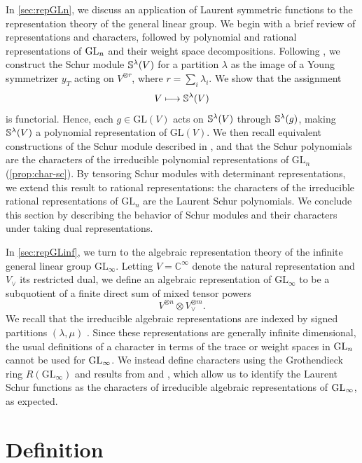 \documentclass[11pt]{amsart}
\begin{document}
In \cref{sec:repGLn}, we discuss an application of Laurent symmetric functions to the representation theory of the general linear group. We begin with a brief review of representations and characters, followed by polynomial and rational representations of $\mathrm{GL}_n$ and their weight space decompositions. Following \cite{Ful97}, we construct the Schur module $\mathbb{S}^\lambda(V)$ for a partition $\lambda$ as the image of a Young symmetrizer $y_T$ acting on $V^{\otimes r}$, where $r=\sum_i \lambda_i$. We show that the assignment
\[V \longmapsto \mathbb{S}^\lambda(V)\]
is functorial. Hence, each $g \in \mathrm{GL}(V)$ acts on $\mathbb{S}^\lambda(V)$ through $\mathbb{S}^\lambda(g)$, making $\mathbb{S}^\lambda(V)$ a polynomial representation of $\mathrm{GL}(V)$. We then recall equivalent constructions of the Schur module described in \cite{Ful97}, and that the Schur polynomials are the characters of the irreducible polynomial representations of $\mathrm{GL}_n$ (\cref{prop:char-sc}). By tensoring Schur modules with determinant representations, we extend this result to rational representations: the characters of the irreducible rational representations of $\mathrm{GL}_n$ are the Laurent Schur polynomials. We conclude this section by describing the behavior of Schur modules and their characters under taking dual representations.

In \cref{sec:repGLinf}, we turn to the algebraic representation theory of the infinite general linear group \(\mathrm{GL}_\infty\). Letting \(V=\mathbb{C}^{\infty}\) denote the natural representation and \(V_\vee\) its restricted dual, we define an algebraic representation of \(\mathrm{GL}_\infty\) to be a subquotient of a finite direct sum of mixed tensor powers
\[
    V^{\otimes n}\otimes V_\vee^{\otimes m}.
\]
We recall that the irreducible algebraic representations are indexed by signed partitions \((\lambda,\mu)\) \cite[Prop. 3.1.4]{SS15}. Since these representations are generally infinite dimensional, the usual definitions of a character in terms of the trace or weight spaces in $\mathrm{GL}_n$ cannot be used for $\mathrm{GL}_\infty$. We instead define characters using the Grothendieck ring $R(\mathrm{GL}_\infty)$ and results from \cite[\S 3.2]{SS19} and \cite[§2]{Koi89}, which allow us to identify the Laurent Schur functions as the characters of irreducible algebraic representations of $\mathrm{GL}_\infty$, as expected.
\section{Definition\label{sec:def}}
\end{document}
